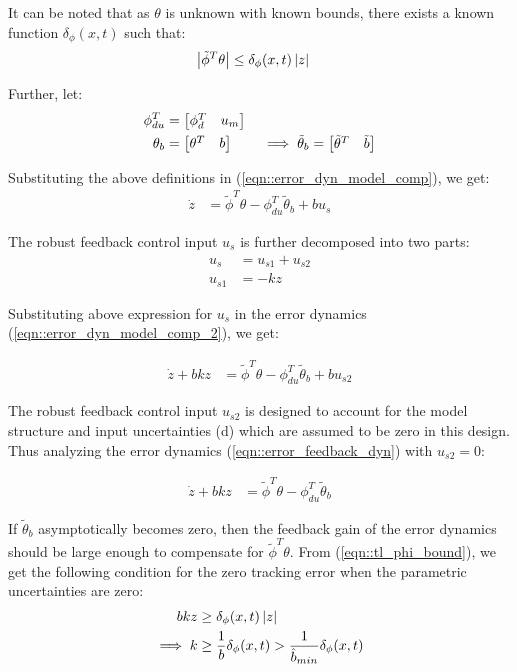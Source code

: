 It can be noted that as $\theta$ is unknown with known bounds, there exists a
known function $\delta_\phi(x, t)$ such that:
\begin{align}
    \left\lvert \tilde \phi^T \theta \right\rvert &\leq \delta_\phi(x, t) \left\lvert z \right\rvert
    \label{eqn::tl_phi_bound}
\end{align}


Further, let:
\begin{align}
    \phi_{du}^T &= \begin{bmatrix} \phi_d^T & u_m \end{bmatrix}\\
    \theta_{b} &= \begin{bmatrix} \theta^T & b \end{bmatrix} \qquad \implies \tilde \theta_b = \begin{bmatrix} \tilde \theta^T & \tilde b \end{bmatrix}
\end{align}

Substituting the above definitions in (\ref{eqn::error_dyn_model_comp}), we get:
\begin{align}
    \dot z &= \tilde \phi^T \theta - \phi_{du}^T \tilde \theta_b + bu_s
    \label{eqn::error_dyn_model_comp_2}
\end{align}

The robust feedback control input $u_s$ is further decomposed into two parts:
\begin{align}
    u_s &= u_{s1} + u_{s2}\\
    u_{s1} &= - k z
\end{align}

Substituting above expression for $u_s$ in the error dynamics
(\ref{eqn::error_dyn_model_comp_2}), we get:

\begin{align}
    \dot z + bk z &= \tilde \phi^T \theta - \phi_{du}^T \tilde \theta_b + bu_{s2}
    \label{eqn::error_feedback_dyn}
\end{align}

The robust feedback control input $u_{s2}$ is designed to account for the model
structure and input uncertainties (d) which are assumed to be zero in this
design. Thus analyzing the error dynamics (\ref{eqn::error_feedback_dyn}) with
$u_{s2} = 0$:

\begin{align*}
    \dot z + bk z &= \tilde \phi^T \theta - \phi_{du}^T \tilde \theta_b
\end{align*}

If $\tilde \theta_b$ asymptotically becomes zero, then the feedback gain of the
error dynamics should be large enough to compensate for $\tilde \phi^T \theta$.
From (\ref{eqn::tl_phi_bound}), we get the following condition for the zero
tracking error when the parametric uncertainties are zero:
\begin{align}
    bkz &\geq \delta_\phi(x, t) \left\lvert z \right\rvert\\
    \implies k &\geq \frac{1}{b}\delta_\phi(x, t) > \frac{1}{\hat b_{min}} \delta_\phi(x, t)
    \label{eqn::k_bound}
\end{align}
